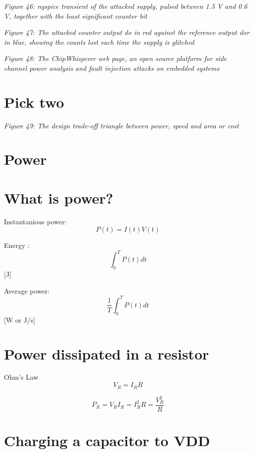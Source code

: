 {
\centering
{}
}

\emph{Figure 46: ngspice transient of the attacked supply, pulsed
between 1.5 V and 0.6 V, together with the least significant counter
bit}


{
\centering
{}
}

\emph{Figure 47: The attacked counter output do in red against the
reference output dor in blue, showing the counts lost each time the
supply is glitched}


{
\centering
{}
}

\emph{Figure 48: The ChipWhisperer web page, an open source platform for
side channel power analysis and fault injection attacks on embedded
systems}

\section{Pick two}\label{pick-two}


{
\centering
{}
}

\emph{Figure 49: The design trade-off triangle between power, speed and
area or cost}

\section{Power}\label{power}

\section{What is power?}\label{what-is-power}

Instantanious power: \[ P(t) = I(t)V(t)\]

Energy : \[ \int_0^T{P(t)dt} \] {[}J{]}

Average power: \[\frac{1}{T} \int_0^T{P(t)dt} \] {[}W or J/s{]}

\section{Power dissipated in a
resistor}\label{power-dissipated-in-a-resistor}

Ohm's Law \[V_R = I_R R\]

\[P_R = V_R I_R =  I_R^2 R  = \frac{V_R^2}{R} \]

\section{Charging a capacitor to VDD}\label{charging-a-capacitor-to-vdd}

